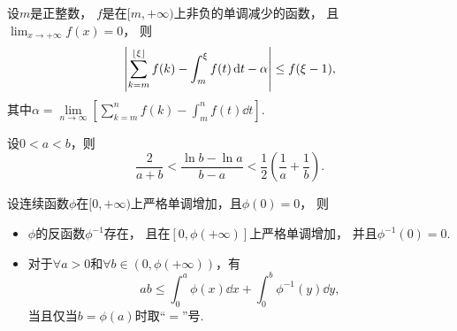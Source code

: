\begin{corollary}
设\(m\)是正整数，
\(f\)是在\([m,+\infty)\)上非负的单调减少的函数，
且\(\lim_{x\to+\infty} f(x) = 0\)，
则\[
	\abs{
		\sum\limits_{k=m}^{\lfloor\xi\rfloor} f(k)
		- \int_m^\xi f(t) \dd{t}
		- \alpha
	}
	\leq
	f(\xi-1),
\]
其中\(\alpha = \lim\limits_{n\to\infty} \left[
	\sum\limits_{k=m}^n f(k)
	- \int_m^n f(t) \dd{t}
\right]\).
\end{corollary}

\begin{proposition}
设\(0<a<b\)，则\begin{equation}
	\frac2{a+b}
	< \frac{\ln b - \ln a}{b - a}
	< \frac12 \left(\frac1a + \frac1b\right).
\end{equation}
\end{proposition}

\begin{proposition}
设连续函数\(\phi\)在\([0,+\infty)\)上严格单调增加，且\(\phi(0) = 0\)，
则\begin{itemize}
	\item \(\phi\)的反函数\(\phi^{-1}\)存在，
	且在\([0,\phi(+\infty)]\)上严格单调增加，
	并且\(\phi^{-1}(0) = 0\).

	\item 对于\(\forall a>0\)和\(\forall b\in(0,\phi(+\infty))\)，有\begin{equation}
		a b \leq \int_0^a \phi(x) \dd{x} + \int_0^b \phi^{-1}(y) \dd{y},
	\end{equation}
	当且仅当\(b = \phi(a)\)时取“\(=\)”号.
\end{itemize}
\end{proposition}
